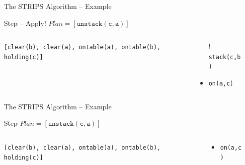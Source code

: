 \documentclass[presentation]{beamer}\mode<presentation>{\usetheme{AMSBolognaFC}}
\begin{document}
\begin{frame}[c]{The STRIPS Algorithm -- Example}
\small

\begin{exampleblock}{Step \nextStripsExampleStep{} -- Apply! \hfill $Plan = [\mathtt{unstack(c,a)}]$}
	\begin{columns}[t]
		\begin{column}{.30\linewidth}\centering
			\texttt{[clear(b), clear(a), ontable(a), ontable(b), holding(c)]}
		\end{column}
		\begin{column}{.50\linewidth}\centering
			\begin{itemize}
				\item[!] \texttt{stack(c,b)}
				\item \texttt{on(a,c)}
			\end{itemize}
		\end{column}
		\begin{column}{.10\linewidth}\centering
			
		\end{column}
	\end{columns}
\end{exampleblock}

\end{frame}


\begin{frame}[c]{The STRIPS Algorithm -- Example}
\small

\begin{exampleblock}{Step \nextStripsExampleStep{} \hfill $Plan = [\mathtt{unstack(c,a)}]$}
	\begin{columns}[t]
		\begin{column}{.30\linewidth}\centering
			\alert{\texttt{[clear(b), clear(a), ontable(a), ontable(b), holding(c)]}}
		\end{column}
		\begin{column}{.50\linewidth}\centering
			\begin{itemize}
				\item \texttt{on(a,c)}
			\end{itemize}
		\end{column}
		\begin{column}{.10\linewidth}\centering
			
		\end{column}
	\end{columns}
\end{exampleblock}

\end{frame}
\end{document}

